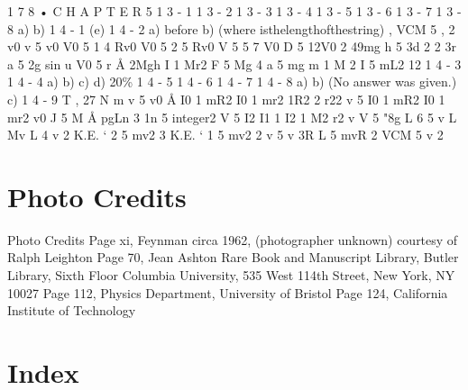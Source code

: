 \documentclass[11pt,oneside]{article}
\begin{document}
1 7 8 • C H A P T E R  5 1 3 - 1 1 3 - 2 1 3 - 3 1 3 - 4 1 3 - 5 1 3 - 6 1 3 - 7 1 3 - 8 a) b) 1 4 - 1 (e) 1 4 - 2 a) before b) (where isthelengthofthestring) , VCM 5 , 2 v0 v 5 v0 V0 5 1 4 Rv0 V0 5 2 5 Rv0 V 5 5 7 V0 D 5 12V0 2 49mg h 5 3d 2 2 3r a 5 2g sin u V0 5 r Å 2Mgh I 1 Mr2 F 5 Mg 4 a 5 mg m 1 M 2 I 5 mL2 12 1 4 - 3 1 4 - 4 a) b) c) d) 20\% 1 4 - 5 1 4 - 6 1 4 - 7 1 4 - 8 a) b) (No answer was given.) c) 1 4 - 9 T , 27 N m v 5 v0 Å I0 1 mR2 I0 1 mr2 1R2 2 r22 v 5 I0 1 mR2 I0 1 mr2 v0 J 5 M Å pgLn 3  1n 5 integer2 V 5 I2 I1 1 I2 1 M2 r2 v V 5 "8g L 6 5 v L Mv L 4 v 2 K.E. ` 2 5 mv2 3 K.E. ` 1 5 mv2 2 v 5 v 3R L 5 mvR 2 VCM 5 v 2\par



\clearpage


\section*{Photo Credits}



\label{tips-sec-14-photo-credits}


Photo Credits Page xi, Feynman circa 1962, (photographer unknown) courtesy of Ralph Leighton Page 70, Jean Ashton Rare Book and Manuscript Library, Butler Library, Sixth Floor Columbia University, 535 West 114th Street, New York, NY 10027 Page 112, Physics Department, University of Bristol Page 124, California Institute of Technology\par



\clearpage


\section*{Index}



\label{tips-sec-15-index}

\end{document}
